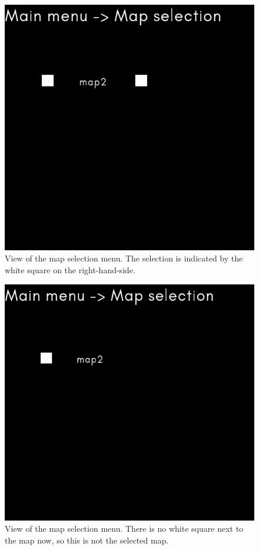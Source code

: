\documentclass{article} %
\begin{document}
\begin{figure}[H]
\centering
\includegraphics[width=120mm]{images/map_s_selected}
\caption{View of the map selection menu. The selection is indicated by the white square on the right-hand-side.}
\label{mapSelect}
\end{figure}  

\begin{figure}[H]
\centering
\includegraphics[width=120mm]{images/map_selection_not_selected}
\caption{View of the map selection menu. There is no white square next to the map now, so this is not the selected map.}
\label{mapNot}
\end{figure}  
\end{document}
